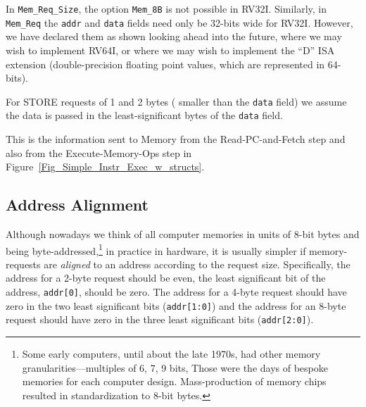 In \verb|Mem_Req_Size|, the option \verb|Mem_8B| is not possible in
RV32I.  Similarly, in \verb|Mem_Req| the \verb|addr| and \verb|data|
fields need only be 32-bits wide for RV32I.  However, we have declared
them as shown looking ahead into the future, where we may wish to
implement RV64I, or where we may wish to implement the ``D'' ISA
extension (double-precision floating point values, which are
represented in 64-bits).

For STORE requests of 1 and 2 bytes ({\ie} smaller than the \verb|data|
field) we assume the data is passed in the least-significant bytes of
the \verb|data| field.

This is the information sent to Memory from the Read-PC-and-Fetch step
and also from the Execute-Memory-Ops step in
Figure~\ref{Fig_Simple_Instr_Exec_w_structs}.


\subsection{Address Alignment}


Although nowadays we think of all computer memories in units of 8-bit
bytes and being byte-addressed,\footnote{Some early computers, until
about the late 1970s, had other memory granularities---multiples of 6,
7, 9 bits, {\etc} Those were the days of bespoke memories for each
computer design.  Mass-production of memory chips resulted in
standardization to 8-bit bytes.} in practice in hardware, it is
usually simpler if memory-requests are \emph{aligned} to an address
according to the request size.  Specifically, the address for a 2-byte
request should be even, {\ie} the least significant bit of the
address, \verb|addr[0]|, should be zero.  The address for a 4-byte
request should have zero in the two least significant bits
(\verb|addr[1:0]|) and the address for an 8-byte request should have
zero in the three least significant bits (\verb|addr[2:0]|).

